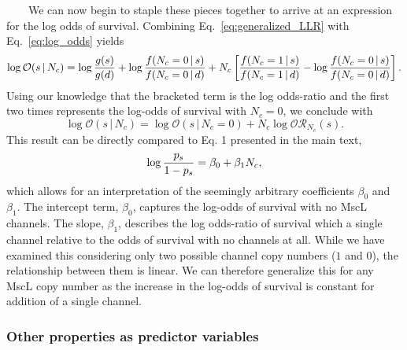 ~~~~We
can
now
begin
to
staple
these
pieces
together
to
arrive
at an
expression
for
the
log
odds
of
survival.
Combining
Eq.~\ref{eq:generalized_LLR}
with
Eq.~\ref{eq:log_odds}
yields
\begin{equation}
\log \mathcal{O}(s\,\vert\,N_c) = \log{g(s) \over g(d)} + \log {f(N_c=0\,\vert\, s) \over f(N_c=0\,\vert\, d)} + N_c\left[{f(N_c=1\,\vert\,s)\over f(N_c=1\,\vert\,d)} - \log{f(N_c=0\,\vert\,s) \over f(N_c=0\,\vert\,d)}\right].
\label{eq:combined_v1}\end{equation}
Using
our
knowledge
that
the
bracketed
term
is the
log
odds-ratio
and
the
first
two
times
represents
the
log-odds
of
survival
with
\(N_c=0\),
we
conclude
with
\begin{equation}
\log\mathcal{O}(s\,\vert\,N_c) = \log \mathcal{O}(s\,\vert\,N_c=0) + N_c \log \mathcal{OR}_{N_c}(s).
\label{eq:bayesian_logit}\end{equation}
This
result
can be
directly
compared
to Eq.
1
presented
in the
main
text,
\begin{equation}
\log {p_s \over 1 - p_s} = \beta_0 + \beta_1 N_c,
\end{equation}
which
allows
for an
interpretation
of the
seemingly
arbitrary
coefficients
\(\beta_0\)
and
\(\beta_1\).
The
intercept
term,
\(\beta_0\),
captures
the
log-odds
of
survival
with
no
MscL
channels.
The
slope,
\(\beta_1\),
describes
the
log
odds-ratio
of
survival
which
a
single
channel
relative
to the
odds
of
survival
with
no
channels
at
all.
While
we
have
examined
this
considering
only
two
possible
channel
copy
numbers
(\(1\)
and
\(0\)),
the
relationship
between
them
is
linear.
We can
therefore
generalize
this
for
any
MscL
copy
number
as the
increase
in the
log-odds
of
survival
is
constant
for
addition
of a
single
channel.

\subsubsection{Other
properties
as
predictor
variables}\label{other-properties-as-predictor-variables}

